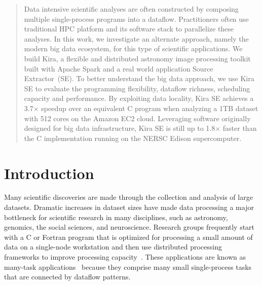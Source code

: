 \documentclass[10pt, conference, compsocconf]{IEEEtran}
\begin{document}
\maketitle

\begin{abstract}
Data intensive scientific analyses are often constructed by composing multiple single-process programs into a dataflow.
Practitioners often use traditional HPC platform and its software stack to parallelize these analyses.
In this work, we investigate an alternate approach, namely the modern big data ecosystem, for this type of scientific applications.
We build Kira, a flexible and distributed astronomy image processing toolkit built with Apache Spark and a real world application Source Extractor~(SE).
To better understand the big data approach, we use Kira SE to evaluate the programming flexibility, dataflow richness, scheduling capacity and performance.
By exploiting data locality, Kira SE achieves a 3.7$\times$ speedup over an equivalent C program when analyzing a 1TB
dataset with 512 cores on the Amazon EC2 cloud. 
Leveraging software originally designed for big data infrastructure, Kira SE is still up to 1.8$\times$ faster than the C implementation
running on the NERSC Edison supercomputer.


\end{abstract}



\section{Introduction}
Many scientific discoveries are made through the collection and analysis of large datasets.
Dramatic increases in dataset sizes have made data processing a major bottleneck for scientific research in many disciplines, such as astronomy, genomics, the social sciences, and neuroscience.
Research groups frequently start with a C or Fortran program that is optimized for processing a small amount of data on a single-node workstation and then use distributed processing frameworks to improve processing capacity~\cite{jacob09, altschul90}.
These applications are known as many-task applications~\cite{raicu08} because they comprise many small single-process tasks that are connected by dataflow patterns.
\end{document}
